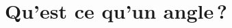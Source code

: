 \chapter{Qu'est ce qu'un angle\,?}
\label{chap_angle}
\setcounter{serieaxiom}{1}
\setcounter{axinum}{1}
\renewcommand{\theaxi}{\Alph{serieaxiom}.\arabic{axi}}





